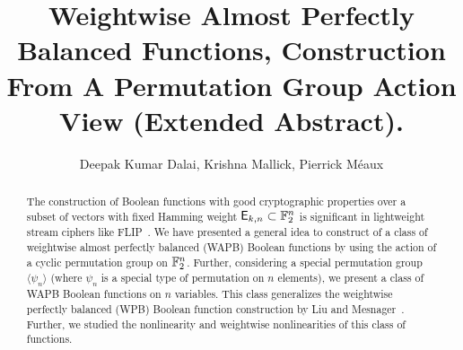 \documentclass{llncs}
\begin{document}
\title{Weightwise Almost Perfectly Balanced Functions, Construction From A Permutation Group Action View (Extended Abstract).}
		

\author{
Deepak Kumar Dalai, Krishna Mallick, Pierrick M\'eaux
}

\maketitle


\setcounter{page}{1}	
\begin{abstract}
The construction of Boolean functions with good cryptographic properties over a subset of vectors with fixed Hamming weight $\mathsf{E}_{k,n} \subset \mathbb{F}_2^n$ is significant in lightweight stream ciphers like FLIP~\cite{EC:MJSC16}. 
We have presented a general idea to construct of a class of weightwise almost perfectly balanced (WAPB) Boolean functions by using the action of a cyclic permutation group on $\mathbb{F}_2^n$. Further, considering a special permutation group $\langle \psi_n \rangle$ (where $\psi_n$ is a special type of permutation on $n$ elements), we present a class of WAPB Boolean functions on $n$ variables. This class generalizes the weightwise perfectly balanced (WPB) Boolean function construction by Liu and Mesnager~\cite{DCC:LiuMes19}. Further, we studied the nonlinearity and weightwise nonlinearities of this class of functions.   
\end{abstract}
 
\end{document}
